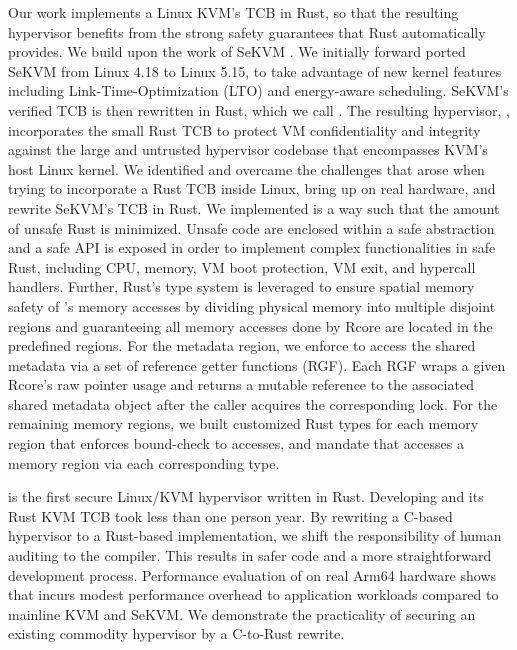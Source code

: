 Our work implements a Linux KVM's TCB in Rust, so that the resulting hypervisor
benefits from the strong safety guarantees that Rust automatically provides.
We build upon the work of SeKVM \cite{sekvm}. We initially forward ported SeKVM
from Linux 4.18 to Linux 5.15, to take advantage of new kernel features
including Link-Time-Optimization (LTO) and energy-aware scheduling. SeKVM's
verified TCB \textit{\secore{}} is then rewritten in Rust, which we call
\textit{\rustcore{}}.
The resulting hypervisor, \rustsec{}, incorporates the small Rust TCB
\rustcore{} to
protect VM confidentiality and integrity against the large and untrusted
hypervisor codebase that encompasses KVM’s host Linux kernel.
We identified and overcame the challenges that arose when trying to
incorporate a Rust TCB inside Linux, bring up \rustsec{} on real hardware, and
rewrite SeKVM's TCB in Rust.
We implemented \rustcore{} is a way such that the amount of unsafe Rust is
minimized.
Unsafe code are enclosed within a safe abstraction and a safe API is exposed
in order to implement complex functionalities in safe Rust, including CPU,
memory, VM boot protection, VM exit, and hypercall handlers.
Further, Rust’s type system is leveraged to ensure spatial memory safety of
\rustcore{}’s memory accesses by dividing physical memory into multiple
disjoint regions and guaranteeing all memory accesses done by Rcore are located
in the predefined regions.
For the \rustcore{} metadata region, we enforce \rustcore{} to access the
shared metadata via a set of reference getter functions (RGF).
Each RGF wraps a given Rcore’s raw pointer usage and returns a mutable
reference to the associated shared metadata object after the caller acquires
the corresponding lock.
For the remaining memory regions, we built
customized Rust types for each memory region that
enforces bound-check to accesses, and mandate that \rustcore{} accesses a
memory region via each corresponding type.

\rustsec{} is the first secure Linux/KVM hypervisor written in Rust.
Developing \rustsec{} and its Rust KVM TCB took less than one person year.
By rewriting a C-based hypervisor to a Rust-based implementation,
we shift the responsibility of human auditing to the compiler.
This results in safer code and a more straightforward development process.
Performance evaluation of \rustsec{} on real Arm64 hardware shows that
\rustsec{} incurs modest performance overhead to application workloads
compared to mainline KVM and SeKVM. We demonstrate the practicality of
securing an existing commodity hypervisor by a C-to-Rust rewrite.

